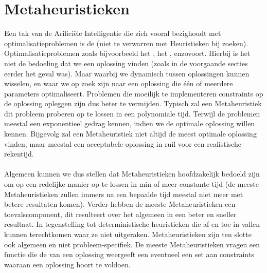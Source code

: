 \section{Metaheuristieken}
\label{s:metaheuristics}
Een tak van de Arificiële Intelligentie die zich vooral bezighoudt met optimalisatieproblemen is de  (niet te verwarren met Heuristieken bij zoeken). Optimalisatieproblemen zoals bijvoorbeeld het , het , enzovoort. Hierbij is het niet de bedoeling dat we een oplossing vinden (zoals in de voorgaande secties eerder het geval was). Maar waarbij we dynamisch tussen oplossingen kunnen wisselen, en waar we op zoek zijn naar een oplossing die één of meerdere parameters optimaliseert. Problemen die moeilijk te implementeren constraints op de oplossing opleggen zijn dus beter te vermijden. Typisch  zal een Metaheuristiek dit probleem proberen op te lossen in een polynomiale tijd. Terwijl de problemen meestal een exponentieel gedrag kennen, indien we de optimale oplossing willen kennen. Bijgevolg zal een Metaheuristiek niet altijd de meest optimale oplossing vinden, maar meestal een acceptabele oplossing in ruil voor een realistische rekentijd.
\paragraph{}
Algemeen kunnen we dus stellen dat Metaheuristieken hoofdzakelijk bedoeld zijn om  op een redelijke manier op te lossen in min of meer constante tijd (de meeste Metaheuristieken zullen immers na een bepaalde tijd meestal niet meer met betere resultaten komen). Verder hebben de meeste Metaheuristieken een toevalscomponent, dit  resulteert over het algemeen in een beter en sneller resultaat. In tegenstelling tot deterministische heuristieken die af en toe in vallen kunnen terechtkomen waar ze niet uitgeraken. Metaheuristieken zijn ten slotte ook algemeen en niet probleem-specifiek. De meeste Metaheuristieken vragen een functie die de  van een oplossing weergeeft een eventueel een set aan constraints waaraan een oplossing hoort te voldoen.
